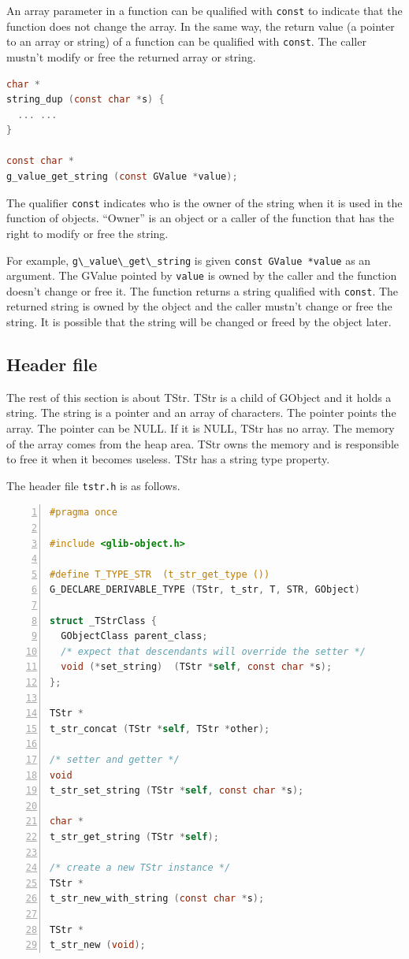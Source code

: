 An array parameter in a function can be qualified with
\passthrough{\lstinline!const!} to indicate that the function does not
change the array. In the same way, the return value (a pointer to an
array or string) of a function can be qualified with
\passthrough{\lstinline!const!}. The caller mustn't modify or free the
returned array or string.

\begin{lstlisting}[language=C]
char *
string_dup (const char *s) {
  ... ...
}

const char *
g_value_get_string (const GValue *value);
\end{lstlisting}

The qualifier \passthrough{\lstinline!const!} indicates who is the owner
of the string when it is used in the function of objects. ``Owner'' is
an object or a caller of the function that has the right to modify or
free the string.

For example, \passthrough{\lstinline!g\_value\_get\_string!} is given
\passthrough{\lstinline!const GValue *value!} as an argument. The GValue
pointed by \passthrough{\lstinline!value!} is owned by the caller and
the function doesn't change or free it. The function returns a string
qualified with \passthrough{\lstinline!const!}. The returned string is
owned by the object and the caller mustn't change or free the string. It
is possible that the string will be changed or freed by the object
later.

\subsection{Header file}\label{header-file}

The rest of this section is about TStr. TStr is a child of GObject and
it holds a string. The string is a pointer and an array of characters.
The pointer points the array. The pointer can be NULL. If it is NULL,
TStr has no array. The memory of the array comes from the heap area.
TStr owns the memory and is responsible to free it when it becomes
useless. TStr has a string type property.

The header file \passthrough{\lstinline!tstr.h!} is as follows.

\begin{lstlisting}[language=C, numbers=left]
#pragma once

#include <glib-object.h>

#define T_TYPE_STR  (t_str_get_type ())
G_DECLARE_DERIVABLE_TYPE (TStr, t_str, T, STR, GObject)

struct _TStrClass {
  GObjectClass parent_class;
  /* expect that descendants will override the setter */
  void (*set_string)  (TStr *self, const char *s);
};

TStr *
t_str_concat (TStr *self, TStr *other);

/* setter and getter */
void
t_str_set_string (TStr *self, const char *s);

char *
t_str_get_string (TStr *self);

/* create a new TStr instance */
TStr *
t_str_new_with_string (const char *s);

TStr *
t_str_new (void);
\end{lstlisting}


